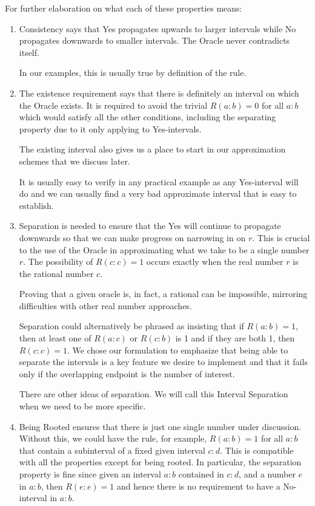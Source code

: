 \documentclass[12pt]{article}
\theoremstyle{remark}
\begin{document}
For further elaboration on what each of these properties means:

\begin{enumerate}

    \item Consistency says that Yes propagates upwards to larger intervals while No propagates downwards to smaller intervals. The Oracle never contradicts itself. 
    
    In our examples, this is usually true by definition of the rule. 

    \item The existence requirement says that there is definitely an interval on which the Oracle exists. It is required to avoid the trivial $R(a:b) = 0$ for all $a:b$ which would satisfy all the other conditions, including the separating property due to it only applying to Yes-intervals. 
    
    The existing interval also gives us a place to start in our approximation schemes that we discuss later. 
    
    It is usually easy to verify in any practical example as any Yes-interval will do and we can usually find a very bad approximate interval that is easy to establish.  

    \item Separation is needed to ensure that the Yes will continue to propagate downwards so that we can make progress on narrowing in on $r$. This is crucial to the use of the Oracle in approximating what we take to be a single number $r$. The possibility of $R(c:c) = 1$ occurs exactly when the real number $r$ is the rational number $c$. 
    
    Proving that a given oracle is, in fact, a rational can be impossible, mirroring difficulties with other real number approaches. 

    Separation could alternatively be phrased as insisting that if $R(a:b) = 1$, then at least one of $R(a:c)$ or $R(c:b)$ is 1 and if they are both 1, then $R(c:c) = 1$. We chose our formulation to emphasize that being able to separate the intervals is a key feature we desire to implement and that it fails only if the overlapping endpoint is the number of interest. 

    There are other ideas of separation. We will call this Interval Separation when we need to be more specific. 
    
    \item Being Rooted ensures that there is just one single number under discussion. Without this, we could have the rule, for example, $R(a:b) = 1$ for all $a:b$ that contain a subinterval of a fixed given interval $c:d$. This is compatible with all the properties except for being rooted. In particular, the separation property is fine since given an interval $a:b$ contained in $c:d$, and a number $e$ in $a:b$, then $R(e:e) = 1$ and hence there is no requirement to have a No-interval in $a:b$. 
    

\end{enumerate}
\end{document}
